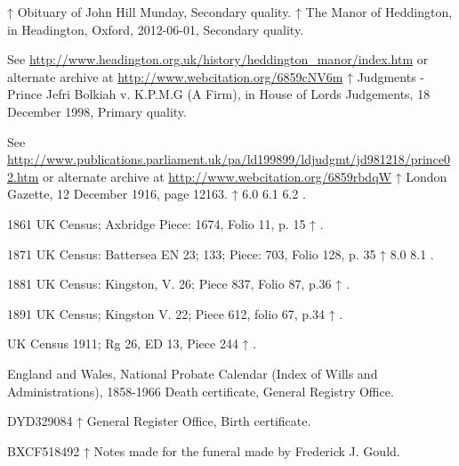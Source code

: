     ↑ Obituary of John Hill Munday, Secondary quality.
    ↑ The Manor of Heddington, in Headington, Oxford, 2012-06-01, Secondary quality.

    See \url{http://www.headington.org.uk/history/heddington_manor/index.htm} or alternate archive at \url{http://www.webcitation.org/6859cNV6m}
    ↑ Judgments - Prince Jefri Bolkiah v. K.P.M.G (A Firm), in House of Lords Judgements, 18 December 1998, Primary quality.

    See \url{http://www.publications.parliament.uk/pa/ld199899/ldjudgmt/jd981218/prince02.htm} or alternate archive at \url{http://www.webcitation.org/6859rbdqW}
    ↑ London Gazette, 12 December 1916, page 12163.
    ↑ 6.0 6.1 6.2 .

    1861 UK Census; Axbridge Piece: 1674, Folio 11, p. 15
    ↑ .

    1871 UK Census: Battersea EN 23; 133; Piece: 703, Folio 128, p. 35
    ↑ 8.0 8.1 .

    1881 UK Census: Kingston, V. 26; Piece 837, Folio 87, p.36
    ↑ .

    1891 UK Census; Kingston V. 22; Piece 612, folio 67, p.34
    ↑ .

    UK Census 1911; Rg 26, ED 13, Piece 244
    ↑ .

    England and Wales, National Probate Calendar (Index of Wills and Administrations), 1858-1966
      Death certificate, General Registry Office.

    DYD329084
    ↑ General Register Office, Birth certificate.

    BXCF518492
    ↑ Notes made for the funeral made by Frederick J. Gould.

